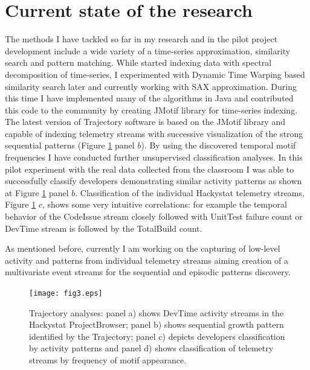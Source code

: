 \documentclass[11pt,oneside]{article}
\begin{document}
\section{Current state of the research}
The methods I have tackled so far in my research and in the pilot project development include a wide variety of a time-series approximation, similarity search and pattern matching. While started indexing data with spectral decomposition of time-series, I experimented with Dynamic Time Warping based similarity search later and currently working with SAX approximation. During this time I have implemented many of the algorithms in Java and contributed this code to the community by creating JMotif library for time-series indexing. The latest version of Trajectory software is based on the JMotif library and capable of indexing telemetry streams with successive visualization of the strong sequential patterns (Figure \ref{fig:fig3} panel $b$). By using the discovered temporal motif frequencies I have conducted further unsupervised classification analyses. In this pilot experiment with the real data collected from the classroom I was able to successfully classify developers demonstrating similar activity patterns as shown at Figure \ref{fig:fig3} panel $b$. Classification of the individual Hackystat telemetry streams, Figure \ref{fig:fig3} $c$, shows some very intuitive correlations: for example the temporal behavior of the CodeIssue stream closely followed with UnitTest failure count or DevTime stream is followed by the TotalBuild count.

As mentioned before, currently I am working on the capturing of low-level activity and patterns from individual telemetry streams aiming creation of a multivariate event streams for the sequential and episodic patterns discovery.

\begin{figure}[tbp]
   \centering
   \texttt{[image: fig3.eps]}
   \caption{Trajectory analyses: panel a) shows DevTime activity streams in the Hackystat ProjectBrowser; panel b) shows sequential growth pattern identified by the Trajectory; panel c) depicts developers classification by activity patterns and panel d) shows classification of telemetry streams by frequency of motif appearance.}
   \label{fig:fig3}
\end{figure}
\end{document}
